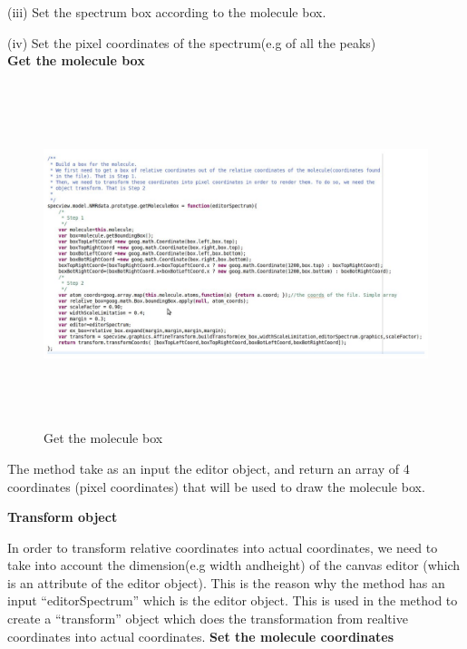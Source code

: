 (iii) Set the spectrum box according to the molecule box.

(iv) Set the pixel coordinates of the spectrum(e.g of all the peaks)
\\

\textbf{Get the molecule box}

    \begin{figure}[h]
    \begin{centering}
    \caption{Get the molecule box}
\includegraphics[width=195mm,height=100mm]{./images/getMoleculeBox}
    \end{centering}
    \end{figure}

The method take as an input the editor object, and return an array of 4 coordinates (pixel coordinates) that will be used to draw the molecule box.

\textbf{Transform object}

In order to transform relative coordinates into actual coordinates, we need to take into account the dimension(e.g width andheight) of the canvas editor (which is an attribute of the editor object). This is the reason why the method has an input ``editorSpectrum'' which is the editor object. This is used in the method to create a ``transform'' object which does the transformation from realtive coordinates into actual coordinates.
\clearpage
\textbf{Set the molecule coordinates}

